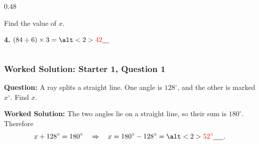 \documentclass[aspectratio=169]{beamer}
\newcommand{\ablank}[1]{%
  \alt<2>{\textcolor{red}{#1}}{\underline{\phantom{#1}}}%
}
\newcommand{\ashow}[1]{\uncover<2->{\textcolor{red}{\small #1}}}
\begin{document}
\begin{frame}
\begin{columns}[t,onlytextwidth]
\begin{column}{0.48\textwidth}

      \vspace{0.7em}
      Find the value of $x$.
      \ashow{\quad $x = 62^\circ$}

      \vfill
        \vspace{1em}
      \textbf{4.} \quad $(84 \div 6) \times 3 = \ablank{42}$
    \end{column}
  \end{columns}

\end{frame}

\begin{frame}
  \frametitle{Worked Solution: Starter 1, Question 1}
  \hypertarget{work-st1}{}

  \textbf{Question:} A ray splits a straight line. One angle is \(128^\circ\), and the other is marked \(x^\circ\). Find \(x\).

  \begin{center}
  \end{center}

  \textbf{Worked Solution:} The two angles lie on a straight line, so their sum is \(180^\circ\). Therefore
  \[
  x + 128^\circ = 180^\circ
  \quad\Rightarrow\quad
  x = 180^\circ - 128^\circ = \ablank{52^\circ}.
  \]
\end{frame}
\end{document}
